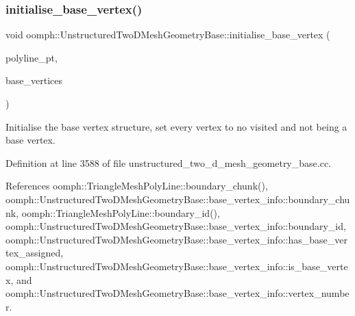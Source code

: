 \subsubsection{\texorpdfstring{initialise\+\_\+base\+\_\+vertex()}{initialise\_base\_vertex()}}
{\footnotesize\ttfamily void oomph\+::\+Unstructured\+Two\+D\+Mesh\+Geometry\+Base\+::initialise\+\_\+base\+\_\+vertex (\begin{DoxyParamCaption}\item[{\hyperlink{classoomph_1_1TriangleMeshPolyLine}{Triangle\+Mesh\+Poly\+Line} $\ast$}]{polyline\+\_\+pt,  }\item[{std\+::map$<$ unsigned, std\+::map$<$ unsigned, \hyperlink{classoomph_1_1Vector}{Vector}$<$ \hyperlink{structoomph_1_1UnstructuredTwoDMeshGeometryBase_1_1base__vertex__info}{base\+\_\+vertex\+\_\+info} $>$ $>$ $>$ \&}]{base\+\_\+vertices }\end{DoxyParamCaption})\hspace{0.3cm}{\ttfamily [protected]}}



Initialise the base vertex structure, set every vertex to no visited and not being a base vertex. 



Definition at line 3588 of file unstructured\+\_\+two\+\_\+d\+\_\+mesh\+\_\+geometry\+\_\+base.\+cc.



References oomph\+::\+Triangle\+Mesh\+Poly\+Line\+::boundary\+\_\+chunk(), oomph\+::\+Unstructured\+Two\+D\+Mesh\+Geometry\+Base\+::base\+\_\+vertex\+\_\+info\+::boundary\+\_\+chunk, oomph\+::\+Triangle\+Mesh\+Poly\+Line\+::boundary\+\_\+id(), oomph\+::\+Unstructured\+Two\+D\+Mesh\+Geometry\+Base\+::base\+\_\+vertex\+\_\+info\+::boundary\+\_\+id, oomph\+::\+Unstructured\+Two\+D\+Mesh\+Geometry\+Base\+::base\+\_\+vertex\+\_\+info\+::has\+\_\+base\+\_\+vertex\+\_\+assigned, oomph\+::\+Unstructured\+Two\+D\+Mesh\+Geometry\+Base\+::base\+\_\+vertex\+\_\+info\+::is\+\_\+base\+\_\+vertex, and oomph\+::\+Unstructured\+Two\+D\+Mesh\+Geometry\+Base\+::base\+\_\+vertex\+\_\+info\+::vertex\+\_\+number.

\mbox{\label{classoomph_1_1UnstructuredTwoDMeshGeometryBase_a23b5ebef48eda89918643c78e927b94a}} 
